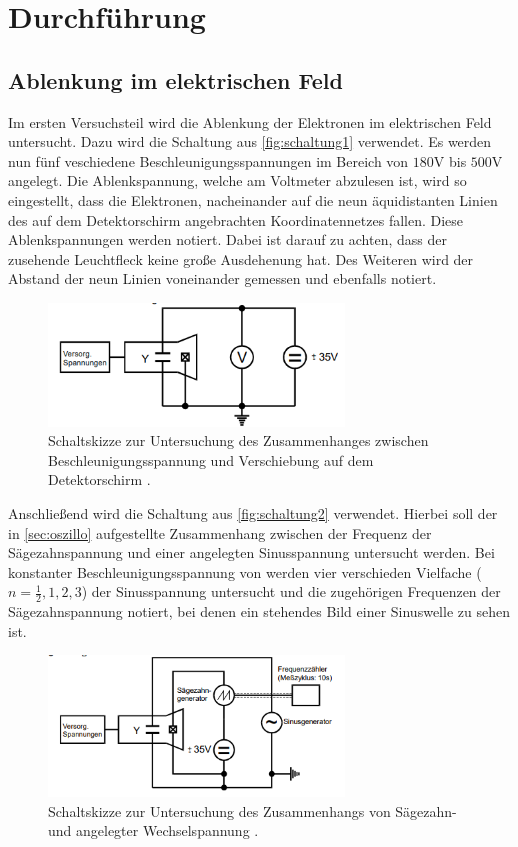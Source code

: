 \section{Durchführung}
\label{sec:Durchführung}
\subsection{Ablenkung im elektrischen Feld}
    Im ersten Versuchsteil wird die Ablenkung der Elektronen im elektrischen Feld untersucht. Dazu wird die Schaltung aus 
    \autoref{fig:schaltung1} verwendet. Es werden nun fünf veschiedene Beschleunigungsspannungen im Bereich von $180$V bis $500$V
    angelegt. Die Ablenkspannung, welche am 
    Voltmeter abzulesen ist, wird so eingestellt, dass die Elektronen, nacheinander auf die neun äquidistanten Linien des auf dem 
    Detektorschirm angebrachten Koordinatennetzes fallen. Diese Ablenkspannungen werden notiert. Dabei ist darauf zu achten, dass der 
    zusehende Leuchtfleck keine große Ausdehenung hat. Des Weiteren wird der Abstand der neun Linien voneinander gemessen und ebenfalls notiert.
    \begin{figure}
        \centering
        \includegraphics[width=0.7\textwidth]{content/schaltung_ablenk.png}
        \caption{Schaltskizze zur Untersuchung des Zusammenhanges zwischen Beschleunigungsspannung und Verschiebung auf dem Detektorschirm \cite{V501-und-V502}.}
        \label{fig:schaltung1}
    \end{figure}


    Anschließend wird die Schaltung aus \autoref{fig:schaltung2} verwendet. Hierbei soll der in \autoref{sec:oszillo} aufgestellte
    Zusammenhang zwischen der Frequenz der Sägezahnspannung und einer angelegten Sinusspannung untersucht werden. 
    Bei konstanter Beschleunigungsspannung von werden vier verschieden Vielfache ($n = \frac{1}{2}, 1, 2, 3$) der Sinusspannung untersucht
    und die zugehörigen Frequenzen der Sägezahnspannung notiert, bei denen ein stehendes Bild einer Sinuswelle zu sehen ist.
     \begin{figure}
        \centering
        \includegraphics[width=0.7\textwidth]{content/wechselschaltung.png}
        \caption{Schaltskizze zur Untersuchung des Zusammenhangs von Sägezahn- und angelegter Wechselspannung \cite{V501-und-V502}.}
        \label{fig:schaltung2}
    \end{figure}
